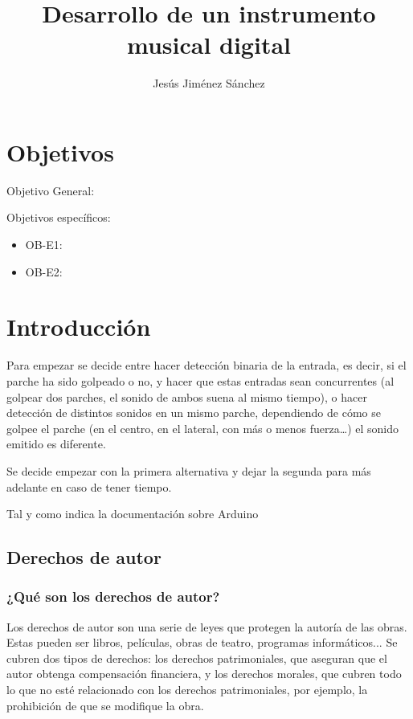 \documentclass{article}
\title{Desarrollo de un instrumento musical digital}
\author{ Jesús Jiménez Sánchez }
\begin{document}
\maketitle

\section*{Objetivos}\label{sec:Objetivos}
Objetivo General:

Objetivos específicos:
\begin{itemize}
    \item OB-E1:
    \item OB-E2:
\end{itemize}

\section{Introducción}\label{sec:Introduccion}
Para empezar se decide entre hacer detección binaria de la entrada, es decir, si el parche ha sido golpeado o no, y hacer que estas entradas sean concurrentes (al golpear dos parches, el sonido de ambos suena al mismo tiempo), o hacer detección de distintos sonidos en un mismo parche, dependiendo de cómo se golpee el parche (en el centro, en el lateral, con más o menos fuerza…) el sonido emitido es diferente.

Se decide empezar con la primera alternativa y dejar la segunda para más adelante en caso de tener tiempo.

Tal y como indica la documentación sobre Arduino \cite{DocArduino}

\subsection{Derechos de autor}
\subsubsection{¿Qué son los derechos de autor?}
Los derechos de autor son una serie de leyes que protegen la autoría de las obras. Estas pueden ser libros, películas, obras de teatro, programas informáticos...\newline
Se cubren dos tipos de derechos: los derechos patrimoniales, que aseguran que el autor obtenga compensación financiera, y los derechos morales, que cubren todo lo que no esté relacionado con los derechos patrimoniales, por ejemplo, la prohibición de que se modifique la obra.\cite{derechos_ompi}
\end{document}

